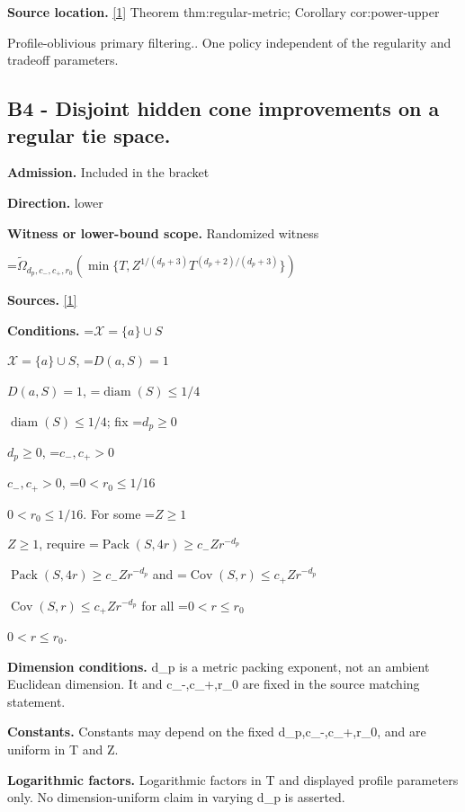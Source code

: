 \documentclass[10pt,a4paper]{article}
\newcommand{\AtlasMath}[1]{\par\begingroup\centering\setbox0=\hbox{$\displaystyle #1$}\ifdim\wd0>1.4\linewidth\typeout{ATLAS WIDE FORMULA: \the\wd0}\fi\ifdim\wd0>\linewidth\resizebox{\linewidth}{!}{\box0}\else\box0\fi\par\endgroup}
\newcommand{\AtlasInlineMath}[1]{\begingroup\setbox0=\hbox{$#1$}\ifdim\wd0>.4\linewidth\endgroup\AtlasMath{#1}\else\endgroup$#1$\fi}
\begin{document}
\textbf{Source location.} \href{https://github.com/WU-Wendao/Colombo/blob/main/colombo_sensorium/Complexity_altas/data/sources/colombo/U07/manuscript.pdf}{[1]} Theorem thm:regular-metric; Corollary cor:power-upper



Profile-oblivious primary filtering.. One policy independent of the regularity and tradeoff parameters.



\subsection{B4 - Disjoint hidden cone improvements on a regular tie space.}


\textbf{Admission.} Included in the bracket



\textbf{Direction.} lower



\textbf{Witness or lower-bound scope.} Randomized witness



\AtlasMath{\widetilde\Omega_{d_p,c_-,c_+,r_0}(\min\{T,Z^{1/(d_p+3)}T^{(d_p+2)/(d_p+3)}\})}


\textbf{Sources.} \href{https://github.com/WU-Wendao/Colombo/blob/main/colombo_sensorium/Complexity_altas/data/sources/colombo/U07/manuscript.pdf}{[1]}



\textbf{Conditions.} \AtlasInlineMath{\mathcal X=\{a\}\cup S}, \AtlasInlineMath{D(a,S)=1}, \AtlasInlineMath{\operatorname{diam}(S)\le1/4}; fix \AtlasInlineMath{d_p\ge0}, \AtlasInlineMath{c_-,c_+>0}, \AtlasInlineMath{0<r_0\le1/16}. For some \AtlasInlineMath{Z\ge1}, require \AtlasInlineMath{\operatorname{Pack}(S,4r)\ge c_-Zr^{-d_p}} and \AtlasInlineMath{\operatorname{Cov}(S,r)\le c_+Zr^{-d_p}} for all \AtlasInlineMath{0<r\le r_0}.



\textbf{Dimension conditions.} d\_p is a metric packing exponent, not an ambient Euclidean dimension. It and c\_-,c\_+,r\_0 are fixed in the source matching statement.



\textbf{Constants.} Constants may depend on the fixed d\_p,c\_-,c\_+,r\_0, and are uniform in T and Z.



\textbf{Logarithmic factors.} Logarithmic factors in T and displayed profile parameters only. No dimension-uniform claim in varying d\_p is asserted.
\end{document}
